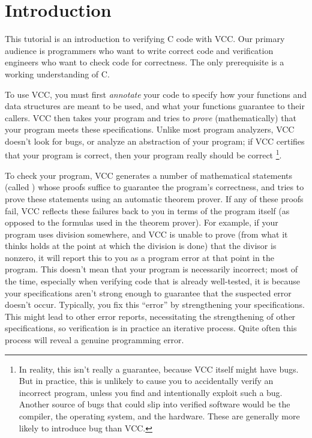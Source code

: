 \section{Introduction}
This tutorial is an introduction to verifying C code with VCC. Our
primary audience is programmers who want to write correct code and
verification engineers who want to check code for correctness. The
only prerequisite is a working understanding of C. 

To use VCC, you must first \emph{annotate} your code to specify how
your functions and data structures are meant to be used, and what your
functions guarantee to their callers.
VCC then
takes your program and tries to \emph{prove} (mathematically) that
your program meets these specifications.  Unlike most program
analyzers, VCC doesn't look for bugs, or analyze an abstraction of
your program; if VCC certifies that your program is correct, then your
program really should be correct
\footnote{
  In reality, this isn't
  really a guarantee, because VCC itself might have bugs. But in
  practice, this is unlikely to cause you to accidentally verify an
  incorrect program, unless you find and intentionally exploit such a
  bug. 
  Another source of bugs that could slip into verified software would be the compiler,
  the operating system, and the hardware. 
  These are generally more likely to introduce bug than VCC.
  }. 

To check your program, VCC generates a number of mathematical
statements (called ) whose proofs
suffice to guarantee the program's correctness, and tries to prove
these statements using an automatic theorem prover. If any of these
proofs fail, VCC reflects these failures back to you in terms of the
program itself (as opposed to the formulas used in the theorem prover).
For example, if your program uses division
somewhere, and VCC is unable to prove (from what it thinks holds at the
point at which the division is done) that the divisor is nonzero, it
will report this to you as a program error at that point in the
program. 
This doesn't mean that your program is necessarily incorrect;
most of the time, especially when verifying code that is already well-tested,
it is because your specifications aren't strong
enough to guarantee that the suspected error doesn't occur.
Typically, you fix this ``error'' by strengthening your
specifications. This might lead to other error reports, necessitating
the strengthening of other specifications, so verification is in
practice an iterative process.  
Quite often this process will reveal a genuine programming error.

